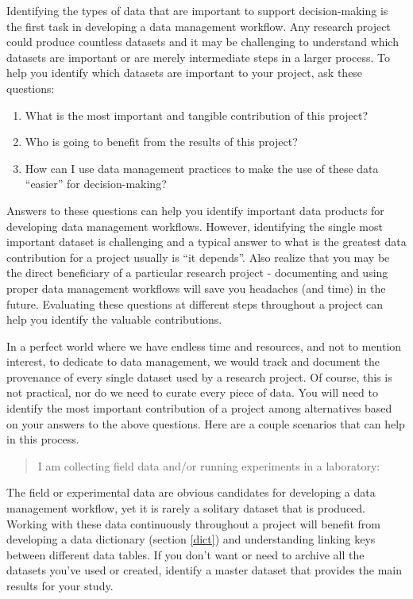 \documentclass[
]{book}
\providecommand{\tightlist}{%
  \setlength{\itemsep}{0pt}\setlength{\parskip}{0pt}}
\begin{document}
Identifying the types of data that are important to support decision-making is the first task in developing a data management workflow. Any research project could produce countless datasets and it may be challenging to understand which datasets are important or are merely intermediate steps in a larger process. To help you identify which datasets are important to your project, ask these questions:

\begin{enumerate}
\def\labelenumi{\arabic{enumi}.}
\tightlist
\item
  What is the most important and tangible contribution of this project?\\
\item
  Who is going to benefit from the results of this project?
\item
  How can I use data management practices to make the use of these data ``easier'' for decision-making?
\end{enumerate}

Answers to these questions can help you identify important data products for developing data management workflows. However, identifying the single most important dataset is challenging and a typical answer to what is the greatest data contribution for a project usually is ``it depends''. Also realize that you may be the direct beneficiary of a particular research project - documenting and using proper data management workflows will save you headaches (and time) in the future. Evaluating these questions at different steps throughout a project can help you identify the valuable contributions.

In a perfect world where we have endless time and resources, and not to mention interest, to dedicate to data management, we would track and document the provenance of every single dataset used by a research project. Of course, this is not practical, nor do we need to curate every piece of data. You will need to identify the most important contribution of a project among alternatives based on your answers to the above questions. Here are a couple scenarios that can help in this process.

\begin{quote}
I am collecting field data and/or running experiments in a laboratory:
\end{quote}

The field or experimental data are obvious candidates for developing a data management workflow, yet it is rarely a solitary dataset that is produced. Working with these data continuously throughout a project will benefit from developing a data dictionary (section \ref{dict}) and understanding linking keys between different data tables. If you don't want or need to archive all the datasets you've used or created, identify a master dataset that provides the main results for your study.
\end{document}
